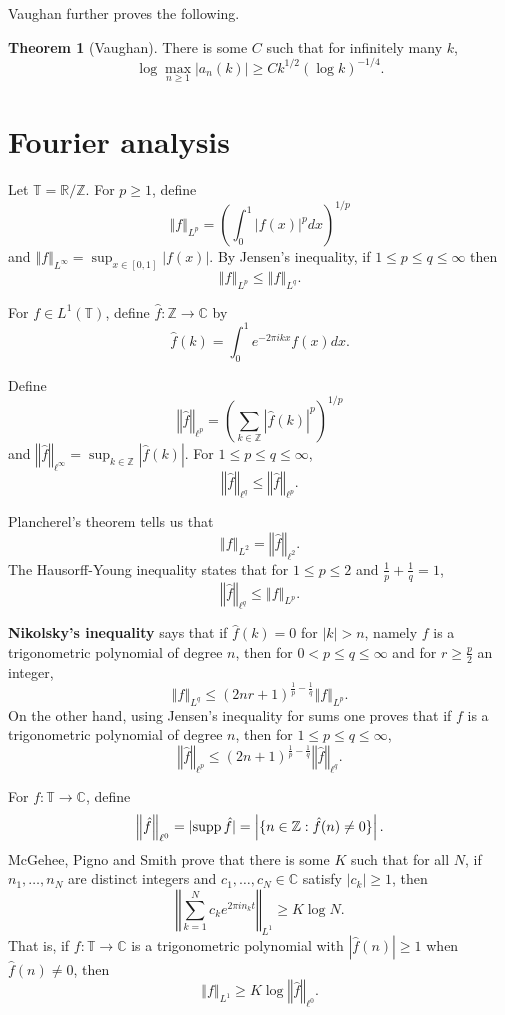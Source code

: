 \documentclass{article}
\newcommand{\supp}{\ensuremath\mathrm{supp}\,}
\newcommand{\norm}[1]{\left\Vert #1 \right\Vert}
\theoremstyle{definition}
\newtheorem{theorem}{Theorem}
\theoremstyle{definition}
\begin{document}
Vaughan further proves the following.

\begin{theorem}[Vaughan]
There is some $C$ such that for infinitely many $k$,
\[
\log \max_{n \geq 1} |a_n(k)| \geq C k^{1/2} (\log k)^{-1/4}.
\]
\end{theorem}






\section{Fourier analysis}
Let $\mathbb{T} = \mathbb{R} / \mathbb{Z}$.
For $p \geq 1$, define
\[
\norm{f}_{L^p} = \left( \int_0^1 |f(x)|^p dx \right)^{1/p}
\]
and $\norm{f}_{L^\infty} = \sup_{x \in [0,1]} |f(x)|$.
By Jensen's inequality,
if $1 \leq p \leq q \leq \infty$ then
\[
\norm{f}_{L^p} \leq \norm{f}_{L^q}.
\]

For $f \in L^1(\mathbb{T})$, define $\widehat{f}:\mathbb{Z} \to \mathbb{C}$ by
\[
\widehat{f}(k) = \int_0^1 e^{-2\pi i kx} f(x) dx.
\]

Define
\[
\norm{\widehat{f}}_{\ell^p} = \left( \sum_{k \in \mathbb{Z}} |\widehat{f}(k)|^p \right)^{1/p}
\]
and $\norm{\widehat{f}}_{\ell^\infty} = \sup_{k \in \mathbb{Z}} |\widehat{f}(k)|$.
For $1 \leq p \leq q \leq \infty$,
\[
\norm{\widehat{f}}_{\ell^q} \leq \norm{\widehat{f}}_{\ell^p}.
\]


Plancherel's theorem  tells us that
\[
\norm{f}_{L^2} = \norm{\widehat{f}}_{\ell^2}.
\]
 The Hausorff-Young inequality states that for $1 \leq p \leq 2$ and $\frac{1}{p}+\frac{1}{q}=1$,
 \[
 \norm{\widehat{f}}_{\ell^q} \leq \norm{f}_{L^p}.
 \]

\textbf{Nikolsky's inequality} \cite[p.~102, Theorem 2.6]{devore} says that if
$\widehat{f}(k) = 0$ for $|k|>n$, namely $f$ is a trigonometric polynomial of degree $n$, then 
for $0<p \leq q \leq \infty$ and for $r \geq \frac{p}{2}$ an integer,
\[
\norm{f}_{L^q} \leq (2nr+1)^{\frac{1}{p}-\frac{1}{q}} \norm{f}_{L^p}.
\]
On the other hand, using Jensen's inequality for sums one proves that if $f$ is a trigonometric polynomial of degree $n$, then for
 $1 \leq p \leq q \leq \infty$, 
 \[
 \norm{\widehat{f}}_{\ell^p} \leq (2n+1)^{\frac{1}{p}-\frac{1}{q}} \norm{\widehat{f}}_{\ell^q}.
 \]

For $f:\mathbb{T} \to \mathbb{C}$, define
\[
\norm{\hat{f}}_{\ell^0} =|\supp \hat{f}| =  \left| \{n \in \mathbb{Z}: \hat{f}(n) \neq 0\} \right|.
\]
McGehee, Pigno and Smith \cite{mcgehee} prove that there is some $K$ such that for all $N$, if
$n_1,\ldots,n_N$ are distinct integers and $c_1,\ldots,c_N \in \mathbb{C}$ satisfy $|c_k| \geq 1$, then
\[
\norm{\sum_{k=1}^N c_k e^{2\pi in_k t}}_{L^1} \geq K \log N.
\]
That is, if $f:\mathbb{T} \to \mathbb{C}$ is a trigonometric polynomial with $|\hat{f}(n)| \geq 1$ when $\hat{f}(n) \neq 0$, then
\[
\norm{f}_{L^1} \geq K \log \norm{\hat{f}}_{\ell^0}.
\]
\end{document}
